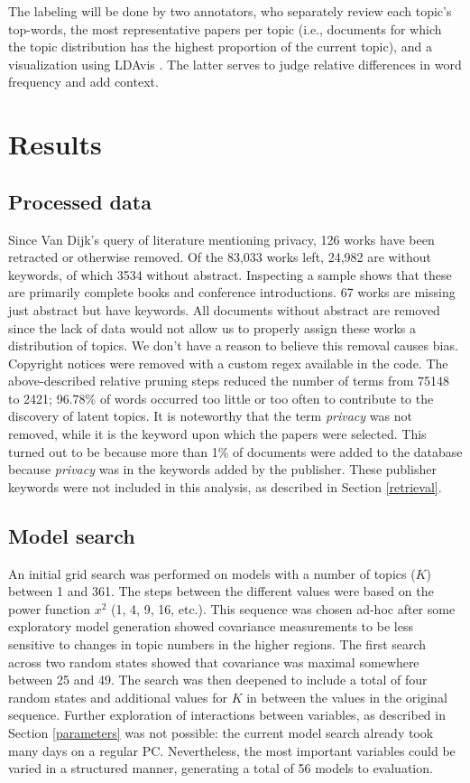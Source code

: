 \documentclass[runningheads]{llncs}
\begin{document}
The labeling will be done by two annotators, who separately review each topic’s top-words, the most representative papers per topic (i.e., documents for which the topic distribution has the highest proportion of the current topic), and a visualization using LDAvis \cite{sievert2014ldavis}. The latter serves to judge relative differences in word frequency and add context.


\section{Results}
\label{results}
\subsection{Processed data}
Since Van Dijk’s \cite{van_dijk_pillars_nodate} query of literature mentioning privacy, 126 works have been retracted or otherwise removed. Of the 83,033 works left, 24,982 are without keywords, of which 3534 without abstract. Inspecting a sample shows that these are primarily complete books and conference introductions. 67 works are missing just abstract but have keywords. All documents without abstract are removed since the lack of data would not allow us to properly assign these works a distribution of topics. We don’t have a reason to believe this removal causes bias. Copyright notices were removed with a custom regex available in the code. The above-described relative pruning steps reduced the number of terms from 75148 to 2421; 96.78\% of words occurred too little or too often to contribute to the discovery of latent topics. It is noteworthy that the term \textit{privacy} was not removed, while it is the keyword upon which the papers were selected. This turned out to be because more than 1\% of documents were added to the database because \textit{privacy} was in the keywords added by the publisher. These publisher keywords were not included in this analysis, as described in Section \ref{retrieval}.

\subsection{Model search}
An initial grid search was performed on models with a number of topics ($K$) between 1 and 361. The steps between the different values were based on the power function $x^2$ (1, 4, 9, 16, etc.). This sequence was chosen ad-hoc after some exploratory model generation showed covariance measurements to be less sensitive to changes in topic numbers in the higher regions. The first search across two random states showed that covariance was maximal somewhere between 25 and 49. The search was then deepened to include a total of four random states and additional values for $K$ in between the values in the original sequence. Further exploration of interactions between variables, as described in Section \ref{parameters} was not possible: the current model search already took many days on a regular PC. Nevertheless, the most important variables could be varied in a structured manner, generating a total of 56 models to evaluation.
\end{document}
